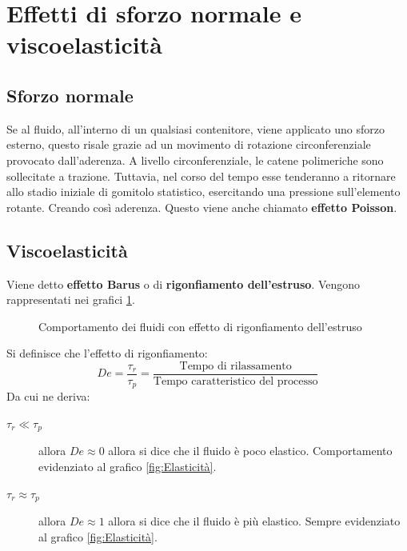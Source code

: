 \section{Effetti di sforzo normale e viscoelasticità}
\subsection{Sforzo normale}
Se al fluido, all'interno di un qualsiasi contenitore, viene applicato uno sforzo esterno, questo risale grazie ad un movimento di rotazione circonferenziale provocato dall'aderenza.
A livello circonferenziale, le catene polimeriche sono sollecitate a trazione. Tuttavia, nel corso del tempo esse tenderanno a ritornare allo stadio iniziale di gomitolo statistico, esercitando una pressione sull'elemento rotante. Creando così aderenza.
Questo viene anche chiamato \textbf{effetto Poisson}.

\subsection{Viscoelasticità}
Viene detto \textbf{effetto Barus} o di \textbf{rigonfiamento dell'estruso}.
Vengono rappresentati nei grafici \ref{fig:RigonfiamentoEstruso}.

\begin{figure}
\centering
{}\quad
{}
\caption{Comportamento dei fluidi con effetto di rigonfiamento dell'estruso}
\label{fig:RigonfiamentoEstruso}
\end{figure}

Si definisce che l'effetto di rigonfiamento:
\begin{equation}
De = \frac{\tau_r}{\tau_p} = \frac{\text{Tempo di rilassamento}}{\text{Tempo caratteristico del processo}}
\end{equation}
Da cui ne deriva:
\begin{description}
\item[$\tau_r \ll \tau_p$] allora $De \approx 0$ allora si dice che il fluido è poco elastico. Comportamento evidenziato al grafico \ref{fig:Elasticità}.
\item[$\tau_r \approx \tau_p$] allora $De \approx 1$ allora si dice che il fluido è più elastico. Sempre evidenziato al grafico \ref{fig:Elasticità}.
\end{description}

